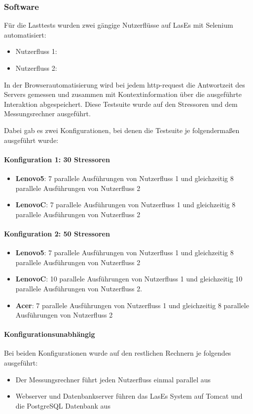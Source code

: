 \subsubsection{Software}

Für die Lasttests wurden zwei gängige Nutzerflüsse auf LasEs mit Selenium automatisiert:
\begin{itemize}
	\item Nutzerfluss 1:
	\item Nutzerfluss 2:
\end{itemize}
In der Browserautomatisierung wird bei jedem http-request die Antwortzeit des Servers gemessen und zusammen mit Kontextinformation über die ausgeführte Interaktion abgespeichert. Diese Testsuite wurde auf den Stressoren und dem Messungsrechner ausgeführt.

Dabei gab es zwei Konfigurationen, bei denen die Testsuite je folgendermaßen ausgeführt wurde:

\paragraph{Konfiguration 1: 30 Stressoren}
\begin{itemize}
	\item \textbf{Lenovo5}: 7 parallele Ausführungen von Nutzerfluss 1 und gleichzeitig 8 parallele Ausführungen von Nutzerfluss 2
	\item \textbf{LenovoC}: 7 parallele Ausführungen von Nutzerfluss 1 und gleichzeitig 8 parallele Ausführungen von Nutzerfluss 2
\end{itemize}

\paragraph{Konfiguration 2: 50 Stressoren}
\begin{itemize}
	\item \textbf{Lenovo5}: 7 parallele Ausführungen von Nutzerfluss 1 und gleichzeitig 8 parallele Ausführungen von Nutzerfluss 2
	\item \textbf{LenovoC}: 10 parallele Ausführungen von Nutzerfluss 1 und gleichzeitig 10 parallele Ausführungen von Nutzerfluss 2.
	\item \textbf{Acer}: 7 parallele Ausführungen von Nutzerfluss 1 und gleichzeitig 8 parallele Ausführungen von Nutzerfluss 2
\end{itemize}

\paragraph{Konfigurationsunabhängig\\}
Bei beiden Konfigurationen wurde auf den restlichen Rechnern je folgendes ausgeführt:
\begin{itemize}
	\item Der Messungsrechner führt jeden Nutzerfluss einmal parallel aus
	\item Webserver und Datenbankserver führen das LasEs System auf Tomcat und die PostgreSQL Datenbank aus
\end{itemize}

